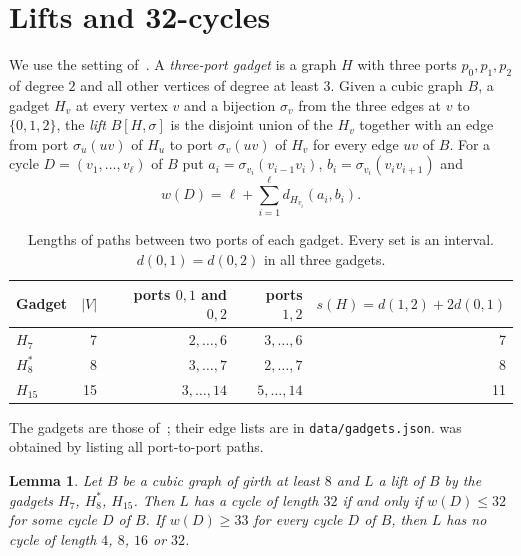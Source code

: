 \documentclass[11pt]{amsart}
\newtheorem{lemma}[theorem]{Lemma}
\theoremstyle{remark}
\newcommand{\code}[1]{\texttt{#1}}
\newcommand{\Hseven}{H_7}
\newcommand{\Hfifteen}{H_{15}}
\newcommand{\Height}{H_8^{*}}
\begin{document}
\section{Lifts and 32-cycles}\label{sec:lifts}

We use the setting of~\cite[Section~2]{Marszalek2026a}. A
\emph{three-port gadget} is a graph $H$ with three ports $p_0,p_1,p_2$ of
degree $2$ and all other vertices of degree at least $3$. Given a cubic graph
$B$, a gadget $H_v$ at every vertex $v$ and a bijection $\sigma_v$ from the
three edges at $v$ to $\{0,1,2\}$, the \emph{lift} $B[H,\sigma]$ is the
disjoint union of the $H_v$ together with an edge from port $\sigma_u(uv)$ of
$H_u$ to port $\sigma_v(uv)$ of $H_v$ for every edge $uv$ of $B$. For a cycle
$D=(v_1,\dots,v_\ell)$ of $B$ put $a_i=\sigma_{v_i}(v_{i-1}v_i)$,
$b_i=\sigma_{v_i}(v_iv_{i+1})$ and
\[
  w(D)=\ell+\sum_{i=1}^{\ell} d_{H_{v_i}}(a_i,b_i).
\]

\begin{table}[ht]
\centering
\caption{Lengths of paths between two ports of each gadget. Every set is an
interval. $d(0,1)=d(0,2)$ in all three gadgets.}
\label{tab:paths}
\begin{tabular}{@{}lrrrr@{}}
\toprule
Gadget & $|V|$ & ports $0,1$ and $0,2$ & ports $1,2$ & $s(H)=d(1,2)+2d(0,1)$\\
\midrule
$\Hseven$   & 7  & $2,\dots,6$  & $3,\dots,6$  & 7\\
$\Height$   & 8  & $3,\dots,7$  & $2,\dots,7$  & 8\\
$\Hfifteen$ & 15 & $3,\dots,14$ & $5,\dots,14$ & 11\\
\bottomrule
\end{tabular}
\end{table}

The gadgets are those of~\cite[Section~3]{Marszalek2026a}; their edge lists
are in \code{data/gadgets.json}.  was obtained by listing all
port-to-port paths.

\begin{lemma}\label{lem:c32}
Let $B$ be a cubic graph of girth at least $8$ and $L$ a lift of $B$ by the
gadgets $\Hseven$, $\Height$, $\Hfifteen$. Then $L$ has a cycle of length $32$
if and only if $w(D)\le 32$ for some cycle $D$ of $B$. If $w(D)\ge 33$ for
every cycle $D$ of $B$, then $L$ has no cycle of length $4$, $8$, $16$ or $32$.
\end{lemma}
\end{document}
